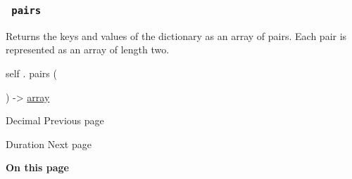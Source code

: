 \subsubsection{\texorpdfstring{\texttt{\ pairs\ }}{ pairs }}\label{definitions-pairs}

Returns the keys and values of the dictionary as an array of pairs. Each
pair is represented as an array of length two.

self { . } { pairs } (

) -\textgreater{} \href{/docs/reference/foundations/array/}{array}

\href{/docs/reference/foundations/decimal/}{\pandocbounded{}}

{ Decimal } { Previous page }

\href{/docs/reference/foundations/duration/}{\pandocbounded{}}

{ Duration } { Next page }

\textbf{On this page}

